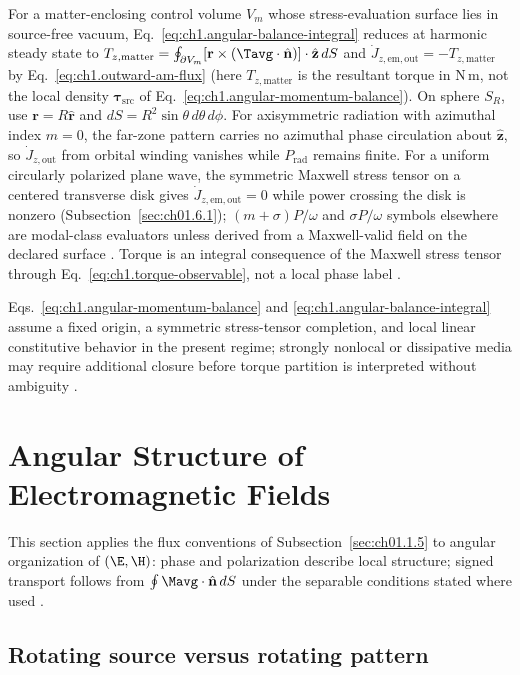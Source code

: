 For a matter-enclosing control volume $V_m$ whose stress-evaluation surface lies in source-free vacuum,
Eq.~\eqref{eq:ch1.angular-balance-integral} reduces at harmonic steady state to
\(T_{z,\mathrm{matter}}=\oint_{\partial V_m}[\mathbf{r}\times(\Tavg\cdot\hat{\mathbf{n}})]\cdot\hat{\mathbf{z}}\,dS\)
and \(\dot J_{z,\mathrm{em,out}}=-T_{z,\mathrm{matter}}\) by Eq.~\eqref{eq:ch1.outward-am-flux} (here $T_{z,\mathrm{matter}}$ is the resultant torque in N\,m, not the local density $\boldsymbol{\tau}_{\mathrm{src}}$ of Eq.~\eqref{eq:ch1.angular-momentum-balance}).
On sphere \(S_R\), use \(\mathbf{r}=R\hat{\mathbf{r}}\) and
\(dS=R^2\sin\theta\,d\theta\,d\phi\). For axisymmetric radiation with azimuthal index $m=0$, the far-zone pattern carries no azimuthal phase circulation about $\hat{\mathbf{z}}$, so $\dot J_{z,\mathrm{out}}$ from orbital winding vanishes while $P_{\mathrm{rad}}$ remains finite. For a uniform circularly polarized plane wave, the symmetric Maxwell stress tensor on a centered transverse disk gives $\dot J_{z,\mathrm{em,out}}=0$ while power crossing the disk is nonzero (Subsection~\ref{sec:ch01.6.1}); $(m+\sigma)P/\omega$ and $\sigma P/\omega$ symbols elsewhere are modal-class evaluators unless derived from a Maxwell-valid field on the declared surface \cite{beth1936,stratton1941}.
Torque is an integral consequence of the Maxwell stress tensor through Eq.~\eqref{eq:ch1.torque-observable}, not a local phase label
\cite{stratton1941}.

Eqs.~\eqref{eq:ch1.angular-momentum-balance}
and \eqref{eq:ch1.angular-balance-integral} assume a fixed origin, a symmetric
stress-tensor completion, and local linear constitutive behavior in the present
regime; strongly nonlocal or dissipative media may require additional closure before
torque partition is interpreted without ambiguity \cite{stratton1941}.

\section{Angular Structure of Electromagnetic Fields}
\label{sec:ch01.2}

This section applies the flux conventions of Subsection~\ref{sec:ch01.1.5} to angular organization of $(\E,\H)$: phase and polarization describe local structure; signed transport follows from $\oint \Mavg\cdot\hat{\mathbf{n}}\,dS$ under the separable conditions stated where used \cite{allen1992,stratton1941,beth1936}.
\subsection{Rotating source versus rotating pattern}
\label{sec:ch01.2.0}

